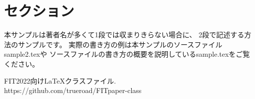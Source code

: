 \documentclass{FITpaper}
\begin{document}
\maketitle

\section{セクション}

本サンプルは著者名が多くて1段では収まりきらない場合に、
2段で記述する方法のサンプルです。
実際の書き方の例は本サンプルのソースファイルsample2.texや
ソースファイルの書き方の概要を説明しているsample.texをご覧ください。

\begin{thebibliography}{9}

  FIT2022向け\LaTeX クラスファイル. \\
  https://github.com/trueroad/FITpaper-class

\end{thebibliography}
\end{document}
